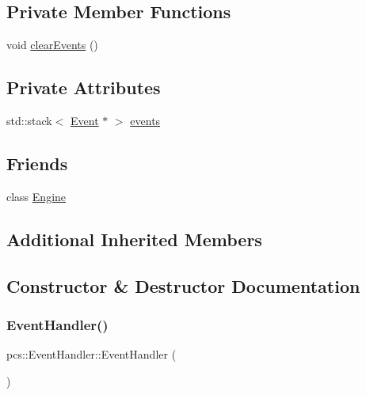 \subsection*{Private Member Functions}
\begin{DoxyCompactItemize}
\item 
void \hyperlink{classpcs_1_1EventHandler_a91240cdab030a6d37b9c9799305a9e8a}{clear\+Events} ()
\end{DoxyCompactItemize}
\subsection*{Private Attributes}
\begin{DoxyCompactItemize}
\item 
std\+::stack$<$ \hyperlink{classpcs_1_1Event}{Event} $\ast$ $>$ \hyperlink{classpcs_1_1EventHandler_a8f0c22c5705bafff72b96b4b5e32907a}{events}
\end{DoxyCompactItemize}
\subsection*{Friends}
\begin{DoxyCompactItemize}
\item 
class \hyperlink{classpcs_1_1EventHandler_a3e1914489e4bed4f9f23cdeab34a43dc}{Engine}
\end{DoxyCompactItemize}
\subsection*{Additional Inherited Members}


\subsection{Constructor \& Destructor Documentation}
\mbox{\label{classpcs_1_1EventHandler_af980c02cecb98a61be2d23dcdbb525c4}} 
\subsubsection{\texorpdfstring{Event\+Handler()}{EventHandler()}}
{\footnotesize\ttfamily pcs\+::\+Event\+Handler\+::\+Event\+Handler (\begin{DoxyParamCaption}{ }\end{DoxyParamCaption})}



